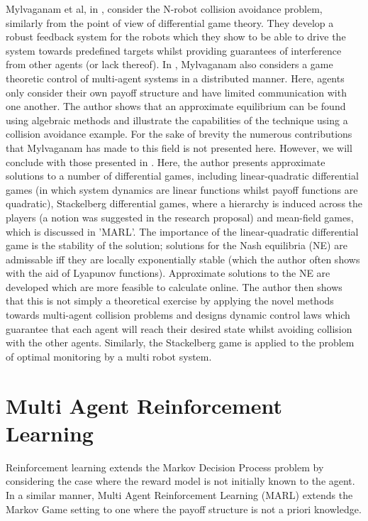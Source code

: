 \documentclass[.../main.tex]{subfiles}
\begin{document}
Mylvaganam et al, in \cite{Mylvaganam2017AutonomousApproach}, consider the N-robot collision
avoidance problem, similarly from the point of view of differential game theory. They develop a
robust feedback system for the robots which they show to be able to drive the system towards
predefined targets whilst providing guarantees of interference from other agents (or lack thereof).
In \cite{MylvaganamASystems}, Mylvaganam also considers a game theoretic control of multi-agent
systems in a distributed manner. Here, agents only consider their own payoff structure and have
limited communication with one another. The author shows that an approximate equilibrium can be
found using algebraic methods and illustrate the capabilities of the technique using a collision
avoidance example. For the sake of brevity the numerous contributions that Mylvaganam has made to
this field is not presented here. However, we will conclude with those presented in
\cite{Mylvaganam2014}. Here, the author presents approximate solutions to a number of differential
games, including linear-quadratic differential games (in which system dynamics are linear functions
whilst payoff functions are quadratic), Stackelberg differential games, where a hierarchy is 
induced across the players (a notion was suggested in the research proposal) and mean-field games,
which is discussed in 'MARL'. The importance of the linear-quadratic
differential game is the stability of the solution; solutions for the Nash equilibria (NE) are
admissable iff they are locally exponentially stable (which the author often shows with the aid of
Lyapunov functions). Approximate solutions to the NE are developed which are more feasible to
calculate online. The author then shows that this is not simply a theoretical exercise by applying
the novel methods towards multi-agent collision problems and designs dynamic control laws which
guarantee that each agent will reach their desired state whilst avoiding collision with the other
agents. Similarly, the Stackelberg game is applied to the problem of optimal monitoring by a multi
robot system.   

\section{Multi Agent Reinforcement Learning} \label{sec::MARL}

Reinforcement learning extends the Markov Decision Process problem by considering the case where the
reward model is not initially known to the agent. In a similar manner, Multi Agent Reinforcement
Learning (MARL) extends the Markov Game setting to one where the payoff structure is not a priori
knowledge. 
\end{document}
